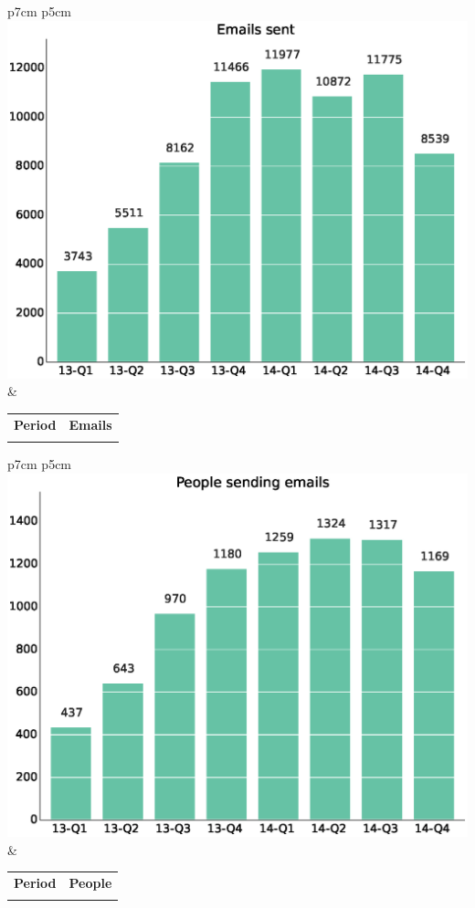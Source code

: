\documentclass[a4wide,11pt]{report}
\begin{document}
\begin{tabular}{p{7cm} p{5cm}}
    \vspace{0pt} 
    \includegraphics[scale=.35]{figs/emails.eps}
    & 
    \vspace{0pt}
    \begin{tabular}{l|l}%
    \bfseries Period & \bfseries Emails %
    \csvreader[head to column names]{data/emails.csv}{}%
    {\\ & \emails}
    \end{tabular}
\end{tabular}

\begin{tabular}{p{7cm} p{5cm}}
    \vspace{0pt} 
    \includegraphics[scale=.35]{figs/emails_senders.eps}
    & 
    \vspace{0pt}
    \begin{tabular}{l|l}%
    \bfseries Period & \bfseries People %
    \csvreader[head to column names]{data/emails_senders.csv}{}%
    {\\ & \senders}
    \end{tabular}
\end{tabular}
\end{document}
